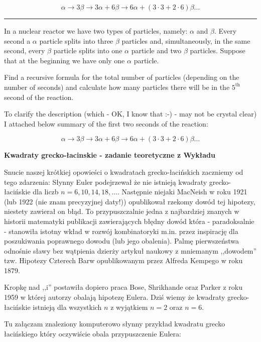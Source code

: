 \documentclass[12pt]{article} %
\newcounter{zad}
\def\numzad{\smallskip\noindent\refstepcounter{zad}{\bf Zadanie \thezad.} }
\begin{document}
\[
\alpha \rightarrow 3 \beta \rightarrow 3 \alpha + 6 \beta \rightarrow
6 \alpha + (3 \cdot 3 + 2 \cdot 6) \beta \ldots
\]

\medskip 
\hrule
\medskip

In a nuclear reactor we have two types of particles, namely:
$\alpha$ and $\beta$. Every second a $\alpha$ particle
splits into three $\beta$ particles and, simultaneously, in the
same second, every $\beta$ particle splits
into one $\alpha$ particle and two $\beta$ particles.
Suppose that at the beginning we have only one $\alpha$ particle.

  Find a recursive formula for the total number of particles
(depending on the number of seconds)  and calculate how many particles
there will be in the $5^{\mathrm{th}}$ second of the reaction.

  To clarify the description (which - OK, I know that :-) -
may not be crystal clear) I attached below
summary of the first two seconds of the reaction:

\[
\alpha \rightarrow 3 \beta \rightarrow 3 \alpha + 6 \beta \rightarrow
6 \alpha + (3 \cdot 3 + 2 \cdot 6) \beta \ldots
\]

\numzad
\begin{flushleft}{\bf Kwadraty grecko-łacinskie - zadanie teoretyczne z Wykładu}
\end{flushleft}
Snucie naszej krótkiej opowieści o kwadratach grecko-łacińskich
zaczniemy od tego zdarzenia: Słynny Euler podejrzewał
że nie istnieją kwadraty grecko-łacińskie dla liczb $n = 6, 10, 14, 18, \ldots$.
  Następnie niejaki MacNeish w roku 1921 (lub 1922 (nie znam precyzyjnej daty!))
opublikował rzekomy dowód tej hipotezy, niestety zawierał on błąd.
  To przypuszczalnie jedna z najbardziej znanych w historii matematyki
publikacji zawierających błędny dowód która - paradoksalnie - stanowiła
istotny wkład w rozwój kombinatoryki m.in. przez inspirację
dla poszukiwania poprawnego dowodu (lub jego obalenia). Palmę
pierwszeństwa odnośnie sławy bez wątpienia dzierży artykuł naukowy
z mniemanym ,,dowodem'' tzw. Hipotezy Czterech Barw opublikowanym przez Alfreda Kempego w roku 1879.

Kropkę nad ,,i'' postawiła dopiero praca  Bose, Shrikhande oraz Parker z roku
1959 w której autorzy obalają hipotezę Eulera.
Dziś wiemy że kwadraty grecko-łacińskie istnieją
dla wszystkich $n$ z wyjątkiem $n = 2$ oraz $n = 6$.

  Tu załączam znaleziony komputerowo słynny przykład kwadratu grecko łacińskiego
który oczywiście obala przypuszczenie Eulera:
\end{document}
